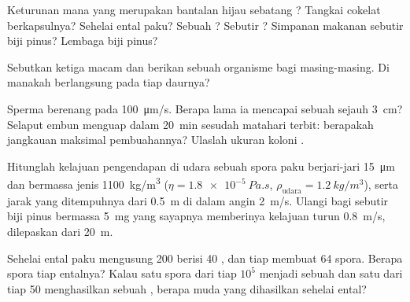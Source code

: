 \begin{exercise}[$\star$]\label{exo:b2:plant-life-cycles:3}
Keturunan mana yang merupakan bantalan hijau sebatang ? Tangkai
cokelat berkapsulnya? Sehelai ental paku? Sebuah ? Sebutir
? Simpanan makanan sebutir biji pinus? Lembaga biji pinus?
\end{exercise}

\begin{exercise}[$\star$]\label{exo:b2:plant-life-cycles:4}
Sebutkan ketiga macam  dan berikan sebuah organisme bagi
masing-masing. Di manakah  berlangsung pada tiap daurnya?
\end{exercise}

\begin{exercise}[$\star\star$]\label{exo:b2:plant-life-cycles:5}
Sperma  berenang pada \qty{100}{\micro m/s}. Berapa lama ia
mencapai sebuah  sejauh \qty{3}{cm}? Selaput embun menguap
dalam \qty{20}{min} sesudah matahari terbit: berapakah jangkauan
maksimal pembuahannya? Ulaslah ukuran koloni .
\end{exercise}

\begin{exercise}[$\star\star$]\label{exo:b2:plant-life-cycles:6}
Hitunglah kelajuan pengendapan di udara sebuah spora paku berjari-jari
\qty{15}{\micro m} dan bermassa jenis \qty{1100}{kg/m^3} ($\eta =
\qty{1.8e-5}{Pa.s}$, $\rho_{\text{udara}} = \qty{1.2}{kg/m^3}$), serta
jarak yang ditempuhnya dari \qty{0.5}{m} di dalam angin \qty{2}{m/s}.
Ulangi bagi sebutir biji pinus bermassa \qty{5}{mg} yang sayapnya
memberinya kelajuan turun \qty{0.8}{m/s}, dilepaskan dari \qty{20}{m}.
\end{exercise}

\begin{exercise}[$\star\star$]\label{exo:b2:plant-life-cycles:7}
Sehelai ental paku mengusung \num{200}  berisi \num{40}
, dan tiap  membuat \num{64} spora. Berapa spora
tiap entalnya? Kalau satu spora dari tiap $10^{5}$ menjadi sebuah
 dan satu  dari tiap \num{50} menghasilkan sebuah
, berapa  muda yang dihasilkan sehelai ental?
\end{exercise}

